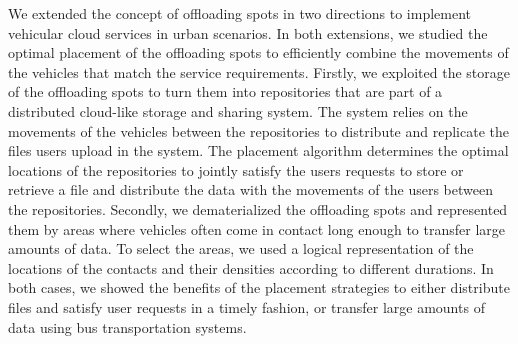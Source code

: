 We extended the concept of offloading spots in two directions to implement vehicular cloud services in urban scenarios. In both extensions, we studied the optimal placement of the offloading spots to efficiently combine the movements of the vehicles that match the service requirements. Firstly, we exploited the storage of the offloading spots to turn them into repositories that are part of a distributed cloud-like storage and sharing system. The system relies on the movements of the vehicles between the repositories to distribute and replicate the files users upload in the system. The placement algorithm determines the optimal locations of the repositories to jointly satisfy the users requests to store or retrieve a file and distribute the data with the movements of the users between the repositories. Secondly, we dematerialized the offloading spots and represented them by areas where vehicles often come in contact long enough to transfer large amounts of data. To select the areas, we used a logical representation of the locations of the contacts and their densities according to different durations. In both cases, we showed the benefits of the placement strategies to either distribute files and satisfy user requests in a timely fashion, or transfer large amounts of data using bus transportation systems.





